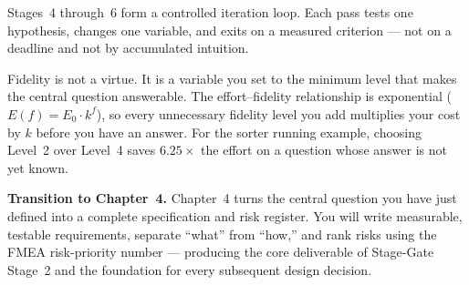 Stages~4 through~6 form a controlled iteration loop.
Each pass tests one hypothesis, changes one variable, and exits on a
measured criterion --- not on a deadline and not by accumulated intuition.

Fidelity is not a virtue.
It is a variable you set to the minimum level that makes the central
question answerable.
The effort--fidelity relationship is exponential ($E(f) = E_0 \cdot k^f$),
so every unnecessary fidelity level you add multiplies your cost by $k$
before you have an answer.
For the sorter running example, choosing Level~2 over Level~4 saves
$6.25\times$ the effort on a question whose answer is not yet known.

\bigskip
\noindent\textbf{Transition to Chapter~4.}
Chapter~4 turns the central question you have just defined into a complete
specification and risk register.
You will write measurable, testable requirements, separate ``what'' from
``how,'' and rank risks using the FMEA risk-priority number --- producing the
core deliverable of Stage-Gate Stage~2 and the foundation for every
subsequent design decision.
